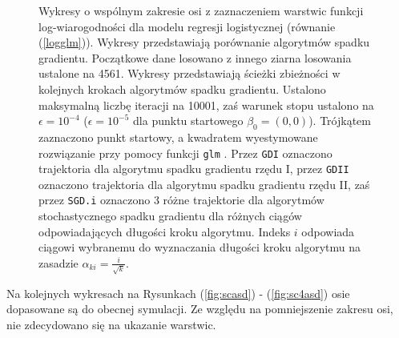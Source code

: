 \begin{figure}[h!]
\begin{center}
\begin{subfigure}[h!]{0.45\textwidth}
            \end{subfigure}
\end{center}
\caption[Porównanie algorytmów spadku gradientu o wspólnym zakresie osi.]{\label{fig:sc5asd} Wykresy o wspólnym zakresie osi z zaznaczeniem warstwic funkcji log-wiarogodności dla modelu regresji logistycznej (równanie (\ref{logglm})). Wykresy przedstawiają porównanie algorytmów spadku gradientu. Początkowe dane losowano z innego ziarna losowania ustalone na 4561. Wykresy przedstawiają ścieżki zbieżności w kolejnych krokach algorytmów spadku gradientu. Ustalono maksymalną liczbę iteracji na 10001, zaś warunek stopu ustalono na $\epsilon=10^{-4}$ ($\epsilon=10^{-5}$ dla punktu startowego $\beta_0 = (0,0)$). Trójkątem zaznaczono punkt startowy, a kwadratem wyestymowane rozwiązanie przy pomocy funkcji \texttt{glm} \cite{glmglm}. Przez \texttt{GDI} oznaczono trajektoria dla algorytmu spadku gradientu rzędu I, przez \texttt{GDII} oznaczono trajektoria dla algorytmu spadku gradientu rzędu II, zaś przez \texttt{SGD.i} oznaczono 3 różne trajektorie dla algorytmów stochastycznego spadku gradientu dla różnych ciągów odpowiadających długości kroku algorytmu. Indeks $i$ odpowiada ciągowi wybranemu do wyznaczania długości kroku algorytmu na zasadzie $\alpha_{ki} = \frac{i}{\sqrt{k}}$.}
\end{figure}

Na kolejnych wykresach na Rysunkach (\ref{fig:scasd}) - (\ref{fig:sc4asd}) osie dopasowane są do obecnej symulacji. Ze względu na pomniejszenie zakresu osi, nie zdecydowano się na ukazanie warstwic.

\newpage

